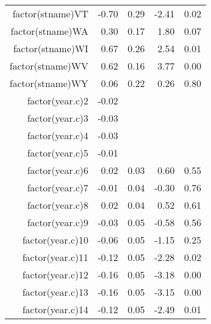 \begin{table}[ht]
\begin{tabular}{rrrrr}
  factor(stname)VT & -0.70 & 0.29 & -2.41 & 0.02 \\ 
  factor(stname)WA & 0.30 & 0.17 & 1.80 & 0.07 \\ 
  factor(stname)WI & 0.67 & 0.26 & 2.54 & 0.01 \\ 
  factor(stname)WV & 0.62 & 0.16 & 3.77 & 0.00 \\ 
  factor(stname)WY & 0.06 & 0.22 & 0.26 & 0.80 \\ 
  factor(year.c)2 & -0.02 &  &  &  \\ 
  factor(year.c)3 & -0.03 &  &  &  \\ 
  factor(year.c)4 & -0.03 &  &  &  \\ 
  factor(year.c)5 & -0.01 &  &  &  \\ 
  factor(year.c)6 & 0.02 & 0.03 & 0.60 & 0.55 \\ 
  factor(year.c)7 & -0.01 & 0.04 & -0.30 & 0.76 \\ 
  factor(year.c)8 & 0.02 & 0.04 & 0.52 & 0.61 \\ 
  factor(year.c)9 & -0.03 & 0.05 & -0.58 & 0.56 \\ 
  factor(year.c)10 & -0.06 & 0.05 & -1.15 & 0.25 \\ 
  factor(year.c)11 & -0.12 & 0.05 & -2.28 & 0.02 \\ 
  factor(year.c)12 & -0.16 & 0.05 & -3.18 & 0.00 \\ 
  factor(year.c)13 & -0.16 & 0.05 & -3.15 & 0.00 \\ 
  factor(year.c)14 & -0.12 & 0.05 & -2.49 & 0.01 \\ 
   \hline
\end{tabular}
\end{table}
